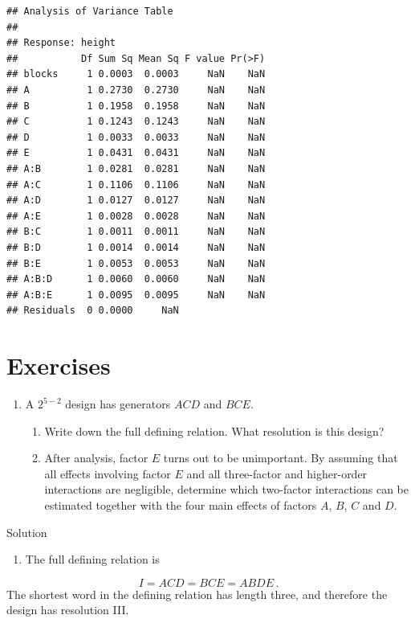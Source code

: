 \documentclass[
]{book}
\providecommand{\tightlist}{%
  \setlength{\itemsep}{0pt}\setlength{\parskip}{0pt}}
\theoremstyle{definition}
\theoremstyle{definition}
\theoremstyle{definition}
\theoremstyle{definition}
\theoremstyle{remark}
\begin{document}
\begin{verbatim}
## Analysis of Variance Table
## 
## Response: height
##           Df Sum Sq Mean Sq F value Pr(>F)
## blocks     1 0.0003  0.0003     NaN    NaN
## A          1 0.2730  0.2730     NaN    NaN
## B          1 0.1958  0.1958     NaN    NaN
## C          1 0.1243  0.1243     NaN    NaN
## D          1 0.0033  0.0033     NaN    NaN
## E          1 0.0431  0.0431     NaN    NaN
## A:B        1 0.0281  0.0281     NaN    NaN
## A:C        1 0.1106  0.1106     NaN    NaN
## A:D        1 0.0127  0.0127     NaN    NaN
## A:E        1 0.0028  0.0028     NaN    NaN
## B:C        1 0.0011  0.0011     NaN    NaN
## B:D        1 0.0014  0.0014     NaN    NaN
## B:E        1 0.0053  0.0053     NaN    NaN
## A:B:D      1 0.0060  0.0060     NaN    NaN
## A:B:E      1 0.0095  0.0095     NaN    NaN
## Residuals  0 0.0000     NaN
\end{verbatim}

\hypertarget{exercises-4}{%
\section{Exercises}\label{exercises-4}}

\begin{enumerate}
\def\labelenumi{\arabic{enumi}.}
\item
  A \(2^{5-2}\) design has generators \(ACD\) and \(BCE\).

  \begin{enumerate}
  \def\labelenumii{\alph{enumii}.}
  \item
    Write down the full defining relation. What resolution is this design?
  \item
    After analysis, factor \(E\) turns out to be unimportant. By assuming that all effects involving factor \(E\) and all three-factor and higher-order interactions are negligible, determine which two-factor interactions can be estimated together with the four main effects of factors \(A\), \(B\), \(C\) and \(D\).
  \end{enumerate}
\end{enumerate}

Solution

\begin{enumerate}
\def\labelenumi{\alph{enumi}.}
\tightlist
\item
  The full defining relation is
\end{enumerate}

\[
I = ACD = BCE = ABDE\,.
\]
The shortest word in the defining relation has length three, and therefore the design has resolution III.
\end{document}
